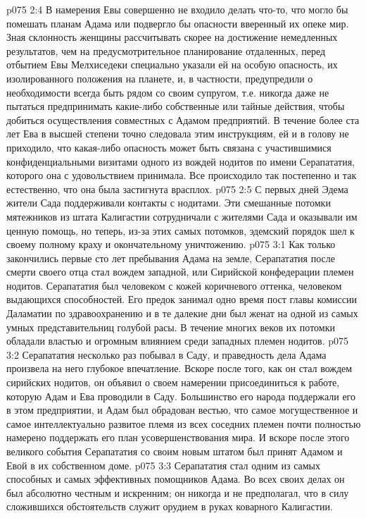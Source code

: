 \vs p075 2:4 \pc В намерения Евы совершенно не входило делать что\hyp{}то, что могло бы помешать планам Адама или подвергло бы опасности вверенный их опеке мир. Зная склонность женщины рассчитывать скорее на достижение немедленных результатов, чем на предусмотрительное планирование отдаленных, перед отбытием Евы Мелхиседеки специально указали ей на особую опасность, их изолированного положения на планете, и, в частности, предупредили о необходимости всегда быть рядом со своим супругом, т.е. никогда даже не пытаться предпринимать какие\hyp{}либо собственные или тайные действия, чтобы добиться осуществления совместных с Адамом предприятий. В течение более ста лет Ева в высшей степени точно следовала этим инструкциям, ей и в голову не приходило, что какая\hyp{}либо опасность может быть связана с участившимися конфиденциальными визитами одного из вождей нодитов по имени Серапататия, которого она с удовольствием принимала. Все происходило так постепенно и так естественно, что она была застигнута врасплох.
\vs p075 2:5 С первых дней Эдема жители Сада поддерживали контакты с нодитами. Эти смешанные потомки мятежников из штата Калигастии сотрудничали с жителями Сада и оказывали им ценную помощь, но теперь, из\hyp{}за этих самых потомков, эдемский порядок шел к своему полному краху и окончательному уничтожению.
\vs p075 3:1 Как только закончились первые сто лет пребывания Адама на земле, Серапататия после смерти своего отца стал вождем западной, или Сирийской конфедерации племен нодитов. Серапататия был человеком с кожей коричневого оттенка, человеком выдающихся способностей. Его предок занимал одно время пост главы комиссии Даламатии по здравоохранению и в те далекие дни был женат на одной из самых умных представительниц голубой расы. В течение многих веков их потомки обладали властью и огромным влиянием среди западных племен нодитов.
\vs p075 3:2 Серапататия несколько раз побывал в Саду, и праведность дела Адама произвела на него глубокое впечатление. Вскоре после того, как он стал вождем сирийских нодитов, он объявил о своем намерении присоединиться к работе, которую Адам и Ева проводили в Саду. Большинство его народа поддержали его в этом предприятии, и Адам был обрадован вестью, что самое могущественное и самое интеллектуально развитое племя из всех соседних племен почти полностью намерено поддержать его план усовершенствования мира. И вскоре после этого великого события Серапататия со своим новым штатом был принят Адамом и Евой в их собственном доме.
\vs p075 3:3 \pc Серапататия стал одним из самых способных и самых эффективных помощников Адама. Во всех своих делах он был абсолютно честным и искренним; он никогда и не предполагал, что в силу сложившихся обстоятельств служит орудием в руках коварного Калигастии.
